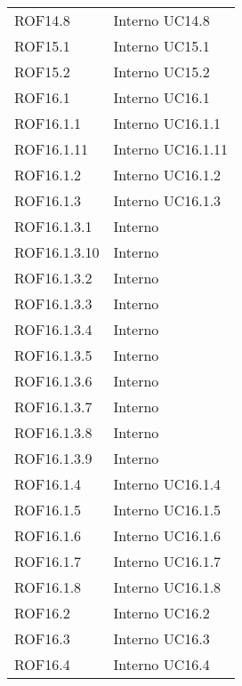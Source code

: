 \begin{longtable}{p{2.5cm}!{\VRule[1pt]}p{2.5cm}}
 \\
ROF14.8 & Interno \newline UC14.8
 \\
ROF15.1 & Interno \newline UC15.1
 \\
ROF15.2 & Interno \newline UC15.2
 \\
ROF16.1 & Interno \newline UC16.1
 \\
ROF16.1.1 & Interno \newline UC16.1.1
 \\
ROF16.1.11 & Interno \newline UC16.1.11
 \\
ROF16.1.2 & Interno \newline UC16.1.2
 \\
ROF16.1.3 & Interno \newline UC16.1.3
 \\
ROF16.1.3.1 & Interno \\
ROF16.1.3.10 & Interno \\
ROF16.1.3.2 & Interno \\
ROF16.1.3.3 & Interno \\
ROF16.1.3.4 & Interno \\
ROF16.1.3.5 & Interno \\
ROF16.1.3.6 & Interno \\
ROF16.1.3.7 & Interno \\
ROF16.1.3.8 & Interno \\
ROF16.1.3.9 & Interno \\
ROF16.1.4 & Interno \newline UC16.1.4
 \\
ROF16.1.5 & Interno \newline UC16.1.5
 \\
ROF16.1.6 & Interno \newline UC16.1.6
 \\
ROF16.1.7 & Interno \newline UC16.1.7
 \\
ROF16.1.8 & Interno \newline UC16.1.8
 \\
ROF16.2 & Interno \newline UC16.2
 \\
ROF16.3 & Interno \newline UC16.3
 \\
ROF16.4 & Interno \newline UC16.4
 \\

\end{longtable}
